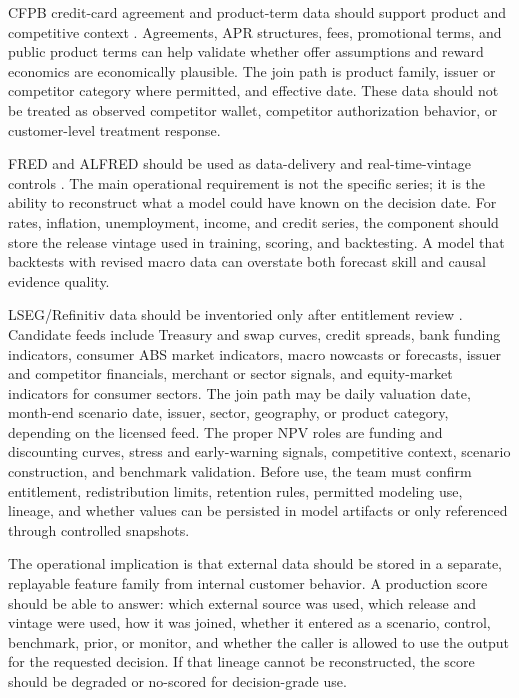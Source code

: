 \documentclass[11pt]{article}
\newcommand{\1}{\mathbf{1}}
\begin{document}
CFPB credit-card agreement and product-term data should support product and
competitive context \citep{cfpbCreditCardData}. Agreements, APR structures,
fees, promotional terms, and public product terms can help validate whether
offer assumptions and reward economics are economically plausible. The join
path is product family, issuer or competitor category where permitted, and
effective date. These data should not be treated as observed competitor
wallet, competitor authorization behavior, or customer-level treatment
response.

FRED and ALFRED should be used as data-delivery and real-time-vintage controls
\citep{fredALFRED}. The main operational requirement is not the specific
series; it is the ability to reconstruct what a model could have known on the
decision date. For rates, inflation, unemployment, income, and credit series,
the component should store the release vintage used in training, scoring, and
backtesting. A model that backtests with revised macro data can overstate both
forecast skill and causal evidence quality.

LSEG/Refinitiv data should be inventoried only after entitlement review
\citep{lsegWorkspace,lsegEconomicData}. Candidate feeds include Treasury and
swap curves, credit spreads, bank funding indicators, consumer ABS market
indicators, macro nowcasts or forecasts, issuer and competitor financials,
merchant or sector signals, and equity-market indicators for consumer sectors.
The join path may be daily valuation date, month-end scenario date, issuer,
sector, geography, or product category, depending on the licensed feed. The
proper NPV roles are funding and discounting curves, stress and early-warning
signals, competitive context, scenario construction, and benchmark validation.
Before use, the team must confirm entitlement, redistribution limits, retention
rules, permitted modeling use, lineage, and whether values can be persisted in
model artifacts or only referenced through controlled snapshots.

The operational implication is that external data should be stored in a
separate, replayable feature family from internal customer behavior. A
production score should be able to answer: which external source was used,
which release and vintage were used, how it was joined, whether it entered as
a scenario, control, benchmark, prior, or monitor, and whether the caller is
allowed to use the output for the requested decision. If that lineage cannot
be reconstructed, the score should be degraded or no-scored for decision-grade
use.
\end{document}
